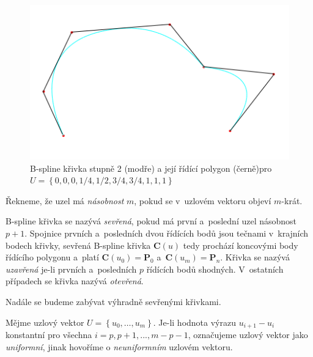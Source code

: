 \begin{figure}[!h]
	\begin{center}
		\includegraphics*[scale=0.9]{obr/krivka2}
	\end{center}
	\caption[caption]{\centering B-spline křivka stupně 2 (modře) a její řídící polygon (černě)\linebreak pro $U=\left\lbrace 0,0,0,1/4,1/2,3/4,3/4,1,1,1\right\rbrace $}
	\label{obrKrivka}
\end{figure}

\begin{definice}
	Řekneme, že uzel má \emph{násobnost} $m$, pokud se v~uzlovém vektoru objeví \linebreak $m$-krát.
\end{definice}

\begin{definice}\label{tangents}
	B-spline křivka se nazývá \emph{sevřená}, pokud má první a~poslední uzel násobnost $p+1$. Spojnice prvních a~posledních dvou řídících bodů jsou tečnami v~krajních bodech křivky, sevřená B-spline křivka  $\mathbf{C}\left(u\right)$ tedy prochází koncovými body řídícího polygonu a~platí $\mathbf{C}\left(u_0\right)=\mathbf{P}_0$ a~$\mathbf{C}\left(u_m\right)=\mathbf{P}_n$. Křivka se nazývá \emph{uzavřená} je-li prvních a~posledních $p$ řídících bodů shodných. V~ostatních případech se křivka nazývá \emph{otevřená}.
\end{definice}

\begin{poznamka}
	Nadále se budeme zabývat výhradně sevřenými křivkami.
\end{poznamka}

\begin{definice}
	Mějme uzlový vektor $U=\left\{u_0,\dots,u_m\right\}$. Je-li hodnota výrazu $u_{i+1}-u_i$ konstantní pro všechna $i=p,p+1,...,m-p-1$, označujeme uzlový vektor jako \emph{uniformní}, jinak hovoříme o \emph{neuniformním} uzlovém vektoru.
\end{definice}

